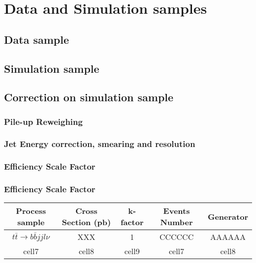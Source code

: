 

\section{Data and Simulation samples}
\label{sec:DataAndMC}

	\subsection{Data sample}
	\label{ssec:DataAndMC_Data}


	\subsection{Simulation sample}
	\label{ssec:DataAndMC_MC}

	\subsection{Correction on simulation sample}
	\label{ssec:DataAndMC_corMC}

		\subsubsection{Pile-up Reweighing}
		\label{sssec:DataAndMC_PU}

		\subsubsection{Jet Energy correction, smearing and resolution}
		\label{sssec:DataAndMC_JE_CSR}

		\subsubsection{Efficiency Scale Factor}
		\label{sssec:DataAndMC_EffSF}

		\subsubsection{Efficiency Scale Factor}
		\label{sssec:DataAndMC_EffSF}





\begin{center}
\begin{tabular}{ c c c c c }
\hline
Process sample & Cross Section (pb) & k-factor & Events Number & Generator \\ 
\hline
$t$$\bar{t}\rightarrow b \bar{b}jjl\nu$ & XXX & 1 & CCCCCC & AAAAAA \\
\hline
cell7 & cell8 & cell9 & cell7 & cell8 \\
\hline  
\end{tabular}
\end{center}


\FloatBarrier
